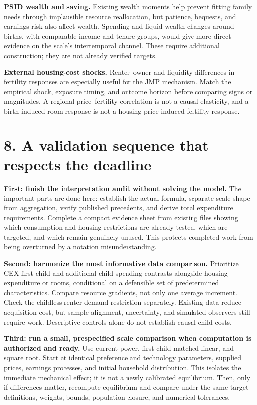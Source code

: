 \documentclass[11pt,letterpaper]{article}
\newcommand{\page}[1]{\newpage\section*{#1}}
\begin{document}
\textbf{PSID wealth and saving.} Existing wealth moments help prevent fitting family needs through implausible resource reallocation, but patience, bequests, and earnings risk also affect wealth. Spending and liquid-wealth changes around births, with comparable income and tenure groups, would give more direct evidence on the scale's intertemporal channel. These require additional construction; they are not already verified targets.

\textbf{External housing-cost shocks.} Renter--owner and liquidity differences in fertility responses are especially useful for the JMP mechanism. Match the empirical shock, exposure timing, and outcome horizon before comparing signs or magnitudes. A regional price--fertility correlation is not a causal elasticity, and a birth-induced room response is not a housing-price-induced fertility response.

\page{8. A validation sequence that respects the deadline}
\textbf{First: finish the interpretation audit without solving the model.} The important parts are done here: establish the actual formula, separate scale shape from aggregation, verify published precedents, and derive total expenditure requirements. Complete a compact evidence sheet from existing files showing which consumption and housing restrictions are already tested, which are targeted, and which remain genuinely unused. This protects completed work from being overturned by a notation misunderstanding.

\textbf{Second: harmonize the most informative data comparison.} Prioritize CEX first-child and additional-child spending contrasts alongside housing expenditure or rooms, conditional on a defensible set of predetermined characteristics. Compare resource gradients, not only one average increment. Check the childless renter demand restriction separately. Existing data reduce acquisition cost, but sample alignment, uncertainty, and simulated observers still require work. Descriptive controls alone do not establish causal child costs.

\textbf{Third: run a small, prespecified scale comparison when computation is authorized and ready.} Use current power, first-child-matched linear, and square root. Start at identical preference and technology parameters, supplied prices, earnings processes, and initial household distribution. This isolates the immediate mechanical effect; it is not a newly calibrated equilibrium. Then, only if differences matter, recompute equilibrium and compare under the same target definitions, weights, bounds, population closure, and numerical tolerances.
\end{document}
